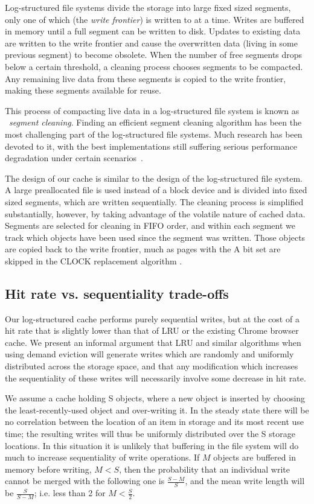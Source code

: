 \documentclass[letterpaper,twocolumn,10pt]{article}
\begin{document}
Log-structured file systems divide the storage into large fixed sized segments,
only one of which (the \emph{write frontier}) is written to at a time.  Writes
are buffered in memory until a full segment can be written to disk.  Updates to
existing data are written to the write frontier and cause the overwritten data
(living in some previous segment) to become obsolete.  When the number of free
segments drops below a certain threshold, a cleaning process chooses segments to
be compacted.  Any remaining live data from these segments is copied to the
write frontier, making these segments available for reuse.

This process of compacting live data in a log-structured file system is known as
~\emph{segment cleaning}.  Finding an efficient segment cleaning algorithm has
been the most challenging part of the log-structured file systems.  Much
research has been devoted to it, with the best implementations still suffering serious
performance degradation under certain scenarios~\cite{seltzer93}.

The design of our cache is similar to the design of the log-structured file
system.  A large preallocated file is used instead of a block device and is
divided into fixed sized segments, which are written sequentially. The
cleaning process is simplified substantially, however, by taking
advantage of the volatile nature of cached data. Segments are selected
for cleaning in FIFO order, and within each segment we track which
objects have been used since the segment was written. Those objects
are copied back to the write frontier, much as pages with the A bit
set are skipped in the CLOCK replacement algorithm \cite{corbato_paging_1969}.

\subsection{Hit rate vs. sequentiality trade-offs}

Our log-structured cache performs purely sequential writes, but at the
cost of a hit rate that is slightly lower than that of LRU or the
existing Chrome browser cache. We present an informal argument that
LRU and similar algorithms when using demand eviction will generate
writes which are randomly and uniformly distributed across the storage
space, and that any modification which increases the sequentiality of
these writes will necessarily involve some decrease in hit rate.

We assume a cache holding S objects, where a new object is inserted by
choosing the least-recently-used object and over-writing it. In the
steady state there will be no correlation between the location of
an item in storage and its most recent use time; the resulting writes
will thus be uniformly distributed over the S storage locations.
In this situation it is unlikely that buffering in the file system
will do much to increase sequentiality of write operations.
If $M$ objects are buffered in memory before writing, $M<S$,
then the probability that an individual write cannot be merged with
the following one is $\frac{S-M}{S}$, and the mean write length will
be $\frac{S}{S-M}$; i.e. less than 2 for $M<\frac{S}{2}$.
\end{document}
